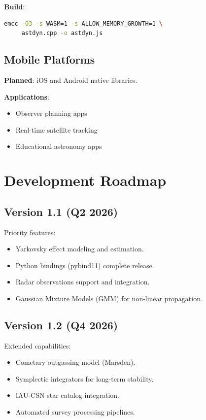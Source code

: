 \textbf{Build}:
\begin{lstlisting}[language=bash]
emcc -O3 -s WASM=1 -s ALLOW_MEMORY_GROWTH=1 \
     astdyn.cpp -o astdyn.js
\end{lstlisting}

\subsection{Mobile Platforms}

\textbf{Planned}: iOS and Android native libraries.

\textbf{Applications}:
\begin{itemize}
    \item Observer planning apps
    \item Real-time satellite tracking
    \item Educational astronomy apps
\end{itemize}

\section{Development Roadmap}

\subsection{Version 1.1 (Q2 2026)}

Priority features:
\begin{itemize}
    \item Yarkovsky effect modeling and estimation.
    \item Python bindings (pybind11) complete release.
    \item Radar observations support and integration.
    \item Gaussian Mixture Models (GMM) for non-linear propagation.
\end{itemize}

\subsection{Version 1.2 (Q4 2026)}

Extended capabilities:
\begin{itemize}
    \item Cometary outgassing model (Marsden).
    \item Symplectic integrators for long-term stability.
    \item IAU-CSN star catalog integration.
    \item Automated survey processing pipelines.
\end{itemize}

